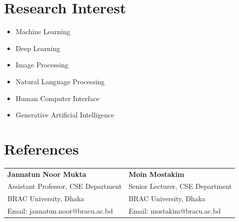 \documentclass[11.5pt,a4paper]{article}
\begin{document}
\section*{Research Interest}
\begin{itemize}
    \item Machine Learning
    \item Deep Learning
    \item Image Processing
    \item Natural Language Processing
    \item Human Computer Interface
    \item Generative Artificial Intelligence
\end{itemize}

\section*{References}

\begin{tabularx}{\textwidth}{X X}
\textbf{Jannatun Noor Mukta} & \textbf{Moin Mostakim} \\
Assistant Professor, CSE Department & Senior Lecturer, CSE Department \\
BRAC University, Dhaka & BRAC University, Dhaka \\
Email: jannatun.noor@bracu.ac.bd & Email: mostakim@bracu.ac.bd \\
\end{tabularx}
\end{document}
